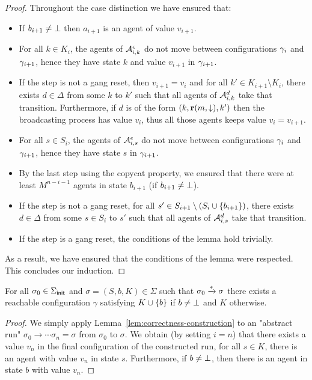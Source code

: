 \begin{proof}
Throughout the case distinction we have ensured that:
\begin{itemize}
	\item If $b_{i+1} \neq \bot$ then $a_{i+1}$ is an agent of value $v_{i+1}$.
	
	\item For all $k \in K_{i}$, the agents of $\mathcal{A}_{i,k}^\epsilon$ do not move between configurations $\gamma_{i}$ and $\gamma_{i+1}$, hence they have state $k$ and value $v_{i+1}$ in $\gamma_{i+1}$.
	
	\item If the step is not a gang reset, then $v_{i+1} = v_i$ and for all $k' \in K_{i+1} \setminus K_i$, there exists $d \in \Delta$ from some $k$ to $k'$ such that all agents of $\mathcal{A}_{i,k}^d$ take that transition. Furthermore, if $d$ is of the form $(k,\textbf{r}(m, \downarrow),k')$ then the broadcasting process has value $v_i$, thus all those agents keeps value $v_i = v_{i+1}$. 
	
	\item For all $s \in S_{i}$, the agents of $\mathcal{A}_{i,s}^\epsilon$ do not move between configurations $\gamma_{i}$ and $\gamma_{i+1}$, hence they have state $s$ in $\gamma_{i+1}$.
	
	\item By the last step using the copycat property, we ensured that there were at least $M^{n-i-1}$ agents in state $b_{i+1}$ (if $b_{i+1} \neq \bot$).
	
	\item If the step is not a gang reset, for all $s' \in S_{i+1} \setminus (S_i \cup \{b_{i+1}\})$, there exists $d \in \Delta$ from some $s \in S_i$ to $s'$ such that all agents of $\mathcal{A}_{i,s}^d$ take that transition.
	
	\item If the step is a gang reset, the conditions of the lemma hold trivially.
\end{itemize}

As a result, we have ensured that the conditions of the lemma were respected.
This concludes our induction.
\end{proof}


\begin{corollary}
	\label{cor:soundness}
	For all $\sigma_0 \in \Sigma_{\mathsf{init}}$ and $\sigma = (S, b, K) \in \Sigma$ such that $\sigma_0 \xrightarrow{*} \sigma$ there exists a reachable configuration $\gamma$ satisfying $K \cup \{b\}$ if $b \neq \bot$ and $K$ otherwise.
\end{corollary}

\begin{proof}
	We simply apply Lemma~\ref{lem:correctness-construction} to an "abstract run" $\sigma_0 \to \cdots \sigma_n = \sigma$ from $\sigma_0$ to $\sigma$.
	We obtain (by setting $i = n$) that there exists a value $v_n$ in the final configuration of the constructed run, for all $s \in K$, there is an agent with value $v_n$ in state $s$. Furthermore, if $b \neq \bot$, then there is an agent in state $b$ with value $v_n$.  
\end{proof}

